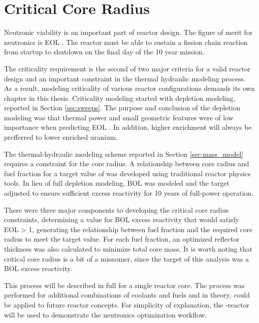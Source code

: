 \section{Critical Core Radius}\label{crit_radius}

Neutronic viability is an important part of reactor design. The figure of merit
for neutronics is EOL \keff. The reactor must be able to sustain a fission
chain reaction from startup to shutdown on the final day of the 10 year mission.

The criticality requirement is the second of two major criteria for a valid reactor design and an
important constraint in the thermal hydraulic modeling process. As a result,
modeling criticality of various reactor configurations demands its own chapter
in this thesis. Criticality modeling started with depletion modeling, reported
in Section \ref{sec:sweeps}. The purpose and conclusion of the depletion
modeling was that thermal power and small geometric features were of low
importance when predicting EOL \keff. In addition, higher enrichment will always
be prefferred to lower enriched uranium.

The thermal-hydraulic modeling scheme
reported in Section \ref{sec:mass_model} requires a constraint for the core
radius. A relationship between core radius and fuel fraction for a target
value of \keff was developed using traditional reactor physics tools. In lieu of
full depletion modeling, BOL \keff was modeled and the \keff target adjusted to
ensure sufficient excess reactivity for 10 years of full-power operation.

There were three major components to developing the critical core radius
constraints, determining a value for BOL excess reactivity that would satisfy
EOL \keff > 1, generating the relationship between fuel fraction and the
required core radius to meet the target \keff value. For each fuel fraction, an
optimized reflector thickness was also calculated to minimize total core mass.
It is worth noting that critical core radius is a
bit of a misnomer, since the target of this analysis was a BOL excess
reactivity.

This process will be described in full for a single reactor core. The process
was performed for additional combinations of coolants and fuels and in theory,
could be applied to future reactor concepts. For simplicity of explanation, the
\uox-\codiox reactor will be used to demonstrate the neutronics optimization
workflow.

